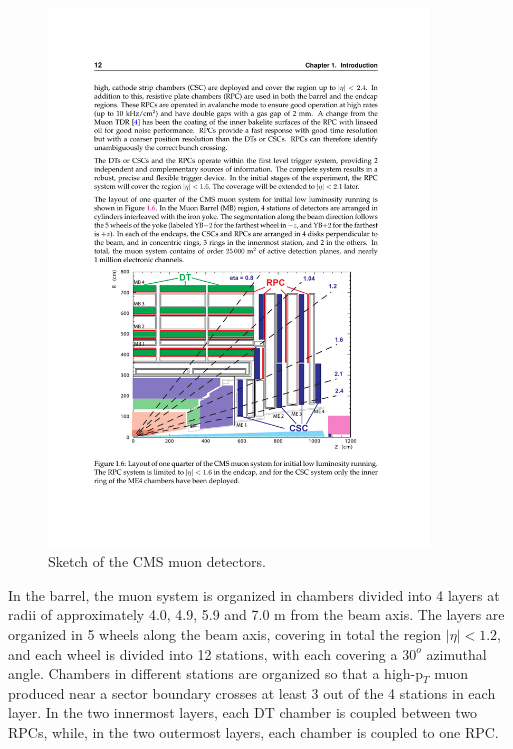 \begin{figure}[h]
\centering 
\includegraphics[width=0.9\textwidth]{figures/cms_muon}\hfil
\caption{Sketch of the CMS muon detectors. }
\label{fig:cms_muon}
\end{figure}


In the barrel, the muon system is organized in chambers divided into 4 layers at radii of approximately 4.0, 4.9, 5.9 and 7.0 m from the beam axis. 
The layers are organized in 5 wheels along the beam axis, covering in total the region $|\eta| < 1.2$, and each wheel is divided into 12 stations, with each covering a $30^{o}$ azimuthal angle. 
Chambers in different stations are organized so that a high-p$_T$ muon produced near a sector boundary crosses at least 3 out of the 4 stations in each layer. 
In the two innermost layers, each DT chamber is coupled between two RPCs, while, in the two outermost layers, each chamber is coupled to one RPC.

